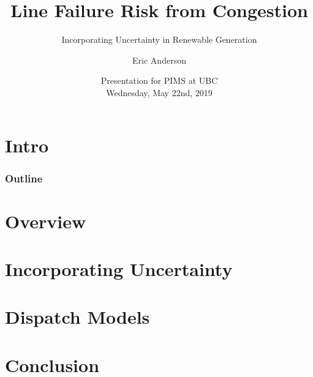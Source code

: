 
\newcommand{\mypathbase}{/home/eric/work/present/pims-present}
\newcommand{\mypathdata}{\mypathbase/data}
\newcommand{\mypathimg}{\mypathbase/img}
\newcommand{\bc}[1]{}

\title[Reliability and Renewable Generation]{Line Failure Risk from Congestion}
\subtitle{Incorporating Uncertainty in Renewable Generation}
\author{Eric Anderson}

\date{Presentation for PIMS at UBC \\
  Wednesday, May 22nd, 2019}


\frame{\titlepage}
\section{Intro}


\subsubsection{Outline}
\frame{\tableofcontents[subsubsectionstyle=hide]}


\section{Overview}


\section{Incorporating Uncertainty}
\frame{\tableofcontents[currentsection,subsubsectionstyle=hide]}



\section{Dispatch Models}
\frame{\tableofcontents[currentsection,subsubsectionstyle=hide]}


\section{Conclusion}





